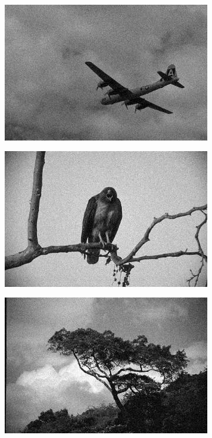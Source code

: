 \documentclass[onecolumn,final,a4paper,13pt,reqno]{siamart}
\begin{document}
\begin{figure}[h]
	\centering
	\begin{subfigure}[t]{0.19\textwidth}
		\includegraphics[scale=0.175]{pictures/denoising/image/3096_tilde.png}
	\end{subfigure}
	\begin{subfigure}[t]{0.19\textwidth}
		\includegraphics[scale=0.175]{pictures/denoising/image/42049_tilde.png}
	\end{subfigure}
	\begin{subfigure}[t]{0.19\textwidth}
		\includegraphics[scale=0.175]{pictures/denoising/image/147091_tilde.png}

\end{subfigure}
\end{figure}
\end{document}
